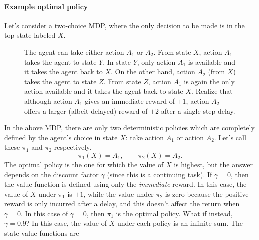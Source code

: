 \documentclass[12pt]{article}
\begin{document}
\paragraph{Example optimal policy}
Let's consider a two-choice MDP, where the only decision to be made is in the top state labeled $X$.
\begin{figure}[h]
  \centering
  \caption{\footnotesize The agent can take either action $A_1$ or $A_2$. From state $X$, action $A_1$ takes the agent to state $Y$. In state $Y$, only action $A_1$ is available and it takes the agent back to $X$. On the other hand, action $A_2$ (from $X$) takes the agent to state $Z$. From state $Z$, action $A_1$ is again the only action available and it takes the agent back to state $X$. Realize that although action $A_1$ gives an immediate reward of $+1$, action $A_2$ offers a larger (albeit delayed) reward of $+2$ after a single step delay.}
\end{figure}
In the above MDP, there are only two deterministic policies which are completely defined by the agent's choice in state $X$: take action $A_1$ or action $A_2$. Let's call these $\pi_1$ and $\pi_2$ respectively.
\[
  \pi_1(X) = A_1, \hspace{25pt} \pi_2(X) = A_2.
\]
The optimal policy is the one for which the value of $X$ is highest, but the answer depends on the discount factor $\gamma$ (since this is a continuing task). If $\gamma = 0$, then the value function is defined using only the \emph{immediate} reward. In this case, the value of $X$ under $\pi_1$ is $+1$, while the value under $\pi_2$ is zero because the positive reward is only incurred after a delay, and this doesn't affect the return when $\gamma = 0$. In this case of $\gamma = 0$, then $\pi_1$ is the optimal policy. What if instead, $\gamma = 0.9$? In this case, the value of $X$ under each policy is an infinite sum. The state-value functions are
\end{document}

